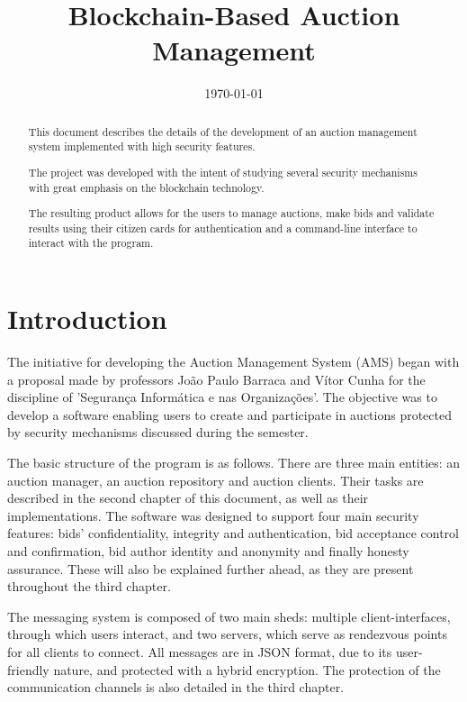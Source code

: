 \documentclass[a4paper]{article}
\title{Blockchain-Based Auction Management}
\date{\today}
\begin{document}
\maketitle

\begin{abstract}
This document describes the details of the development of an auction management system implemented with high security features.

The project was developed with the intent of studying several security mechanisms with great emphasis on the blockchain technology.

The resulting product allows for the users to manage auctions, make bids and validate results using their citizen cards for authentication and a command-line interface to interact with the program.
\end{abstract}

\section{Introduction} %
\label{sec:introduction}

The initiative for developing the Auction Management System (AMS) began with a proposal made by professors João Paulo Barraca and Vítor Cunha for the discipline of 'Segurança Informática e nas Organizações'.
The objective was to develop a software enabling users to create and participate in auctions protected by security mechanisms discussed during the semester.

The basic structure of the program is as follows. 
There are three main entities: an auction manager, an auction repository and auction clients. 
Their tasks are described in the second chapter of this document, as well as their implementations.
The software was designed to support four main security features: bids’ confidentiality, integrity and authentication, bid acceptance control and confirmation, bid author identity and anonymity and finally honesty assurance. 
These will also be explained further ahead, as they are present throughout the third chapter.

The messaging system is composed of two main sheds: multiple client-interfaces, through which users interact, and two servers, which serve as rendezvous points for all clients to connect. 
All messages are in JSON format, due to its user-friendly nature, and protected with a hybrid encryption.
The protection of the communication channels is also detailed in the third chapter.
\end{document}
